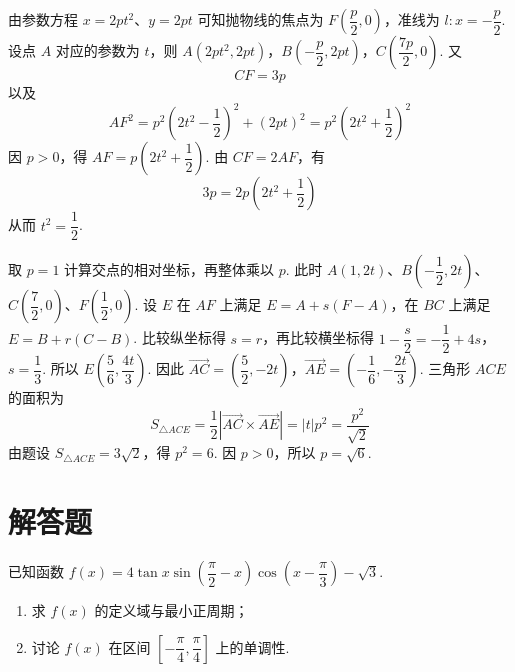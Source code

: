 \begin{solution}
由参数方程 \(x=2pt^2\)、\(y=2pt\) 可知抛物线的焦点为 \(F\left(\dfrac p2,0\right)\)，准线为 \(l:x=-\dfrac p2\). 设点 \(A\) 对应的参数为 \(t\)，则
\(A(2pt^2,2pt)\)，\(B\left(-\dfrac p2,2pt\right)\)，\(C\left(\dfrac{7p}{2},0\right)\).
又
\[CF=3p\]
以及
\[AF^2=p^2\left(2t^2-\dfrac12\right)^2+(2pt)^2=p^2\left(2t^2+\dfrac12\right)^2\]
因 \(p>0\)，得 \(AF=p\left(2t^2+\dfrac12\right)\). 由 \(CF=2AF\)，有
\[3p=2p\left(2t^2+\dfrac12\right)\]
从而 \(t^2=\dfrac12\).

取 \(p=1\) 计算交点的相对坐标，再整体乘以 \(p\). 此时 \(A(1,2t)\)、\(B\left(-\dfrac12,2t\right)\)、\(C\left(\dfrac72,0\right)\)、\(F\left(\dfrac12,0\right)\). 设 \(E\) 在 \(AF\) 上满足 \(E=A+s(F-A)\)，在 \(BC\) 上满足 \(E=B+r(C-B)\). 比较纵坐标得 \(s=r\)，再比较横坐标得
\(1-\dfrac s2=-\dfrac12+4s\)，\(s=\dfrac13\).
所以 \(E\left(\dfrac56,\dfrac{4t}{3}\right)\). 因此
\(\overrightarrow{AC}=\left(\dfrac52,-2t\right)\)，\(\overrightarrow{AE}=\left(-\dfrac16,-\dfrac{2t}{3}\right)\).
三角形 \(ACE\) 的面积为
\[S_{\triangle ACE}=\dfrac12\left|\overrightarrow{AC}\times\overrightarrow{AE}\right|=|t|p^2=\dfrac{p^2}{\sqrt2}\]
由题设 \(S_{\triangle ACE}=3\sqrt2\)，得 \(p^2=6\). 因 \(p>0\)，所以 \(p=\sqrt6\).
\end{solution}

\section{解答题}

\begin{problem}
已知函数 \(f(x)=4\tan x\sin\left(\dfrac\pi2-x\right)\cos\left(x-\dfrac\pi3\right)-\sqrt3\).

\begin{enumerate}
\item 求 \(f(x)\) 的定义域与最小正周期；
\item 讨论 \(f(x)\) 在区间 \(\left[-\dfrac\pi4,\dfrac\pi4\right]\) 上的单调性.
\end{enumerate}
\end{problem}

